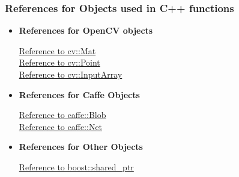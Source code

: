 \documentclass{scrreprt}
\begin{document}
\subsubsection{References for Objects used in C++ functions}

\begin{itemize}
    \item \textbf{References for OpenCV objects}

    \href{http://docs.opencv.org/3.1.0/d3/d63/classcv_1_1Mat.html#details}{Reference to cv::Mat}
    \\
    \href{http://docs.opencv.org/3.1.0/db/d4e/classcv_1_1Point__.html}{Reference to cv::Point}
    \\
    \href{http://docs.opencv.org/3.1.0/d4/d32/classcv_1_1__InputArray.html}{Reference to cv::InputArray}


    \item \textbf{References for Caffe Objects}

    \href{http://caffe.berkeleyvision.org/doxygen/classcaffe_1_1Blob.html}{Reference to caffe::Blob}
    \\
    \href{http://caffe.berkeleyvision.org/doxygen/classcaffe_1_1Net.html}{Reference to caffe::Net}




    \item \textbf{References for Other Objects}

    \href{http://www.boost.org/doc/libs/1_63_0/libs/smart_ptr/shared_ptr.htm}{Reference to boost::shared\_ptr}

\end{itemize}
\end{document}
